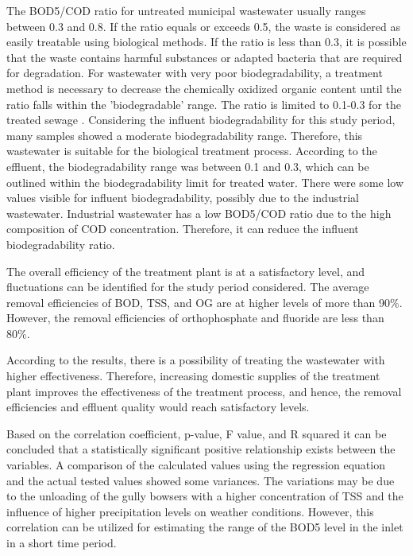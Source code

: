 The \ac{BOD5}/\ac{COD} ratio for untreated municipal wastewater usually ranges between 0.3 and 0.8. If the ratio equals or exceeds 0.5, the waste is considered as easily treatable using biological methods. If the ratio is less than 0.3, it is possible that the waste contains harmful substances or adapted bacteria that are required for degradation. For wastewater with very poor biodegradability, a treatment method is necessary to decrease the chemically oxidized organic content until the ratio falls within the 'biodegradable' range. The ratio is limited to 0.1-0.3 for the treated sewage \cite{AbdulRazzak2013}. Considering the influent biodegradability for this study period, many samples showed a moderate biodegradability range. Therefore, this wastewater is suitable for the biological treatment process. According to the effluent, the biodegradability range was between 0.1 and 0.3, which can be outlined within the biodegradability limit for treated water. There were some low values visible for influent biodegradability, possibly due to the industrial wastewater. Industrial wastewater has a low \ac{BOD5}/\ac{COD} ratio due to the high composition of \ac{COD} concentration. Therefore, it can reduce the influent biodegradability ratio. 

The overall efficiency of the treatment plant is at a satisfactory level, and fluctuations can be identified for the study period considered. The average removal efficiencies of \ac{BOD}, \ac{TSS}, and \ac{OG} are at higher levels of more than 90\%. However, the removal efficiencies of orthophosphate and fluoride are less than 80\%. 

According to the results, there is a possibility of treating the wastewater with higher effectiveness. Therefore, increasing domestic supplies of the treatment plant improves the effectiveness of the treatment process, and hence, the removal efficiencies and effluent quality would reach satisfactory levels.

Based on the correlation coefficient, p-value, F value, and R squared it can be concluded that a statistically significant positive relationship exists between the variables. A comparison of the calculated values using the regression equation and the actual tested values showed some variances. The variations may be due to the unloading of the gully bowsers with a higher concentration of \ac{TSS} and the influence of higher precipitation levels on weather conditions. However, this correlation can be utilized for estimating the range of the \ac{BOD5} level in the inlet in a short time period.

